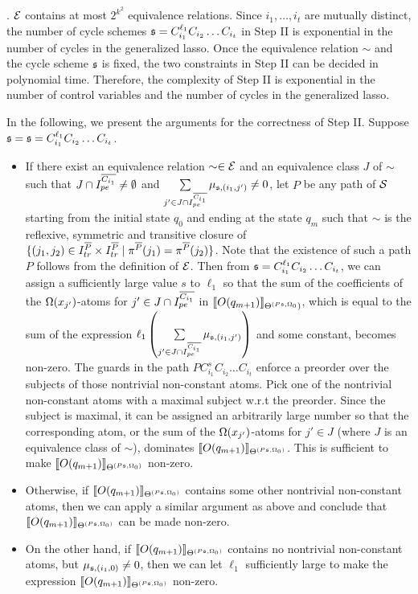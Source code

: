 . ${\mathcal{E} }$ contains at most $2^{k^2}$ equivalence relations. Since $i_1,\dots, i_t$ are mutually distinct, the number of cycle schemes ${\mathfrak{s} } = C_{i_1}^{\ell_1} C_{i_2} \dots C_{i_t}$ in Step II is exponential in the number of cycles in the generalized lasso. Once the equivalence relation $\sim$ and the cycle scheme ${\mathfrak{s} }$ is fixed, the two constraints in Step II can be decided in polynomial time. Therefore, the complexity of Step II is exponential in the number of control variables and the number of cycles in the generalized lasso.

\smallskip
In the following, we present the arguments for the correctness of Step II. Suppose ${\mathfrak{s} } = {\mathfrak{s} }=C_{i_1}^{\ell_1} C_{i_2} \dots C_{i_t}$.
\begin{itemize}
\item If there exist an equivalence relation $\sim \in {\mathcal{E} }$ and an equivalence class $J$ of $\sim$ such that $J \cap I^{\overline{C_{i_1}}}_{pe} \neq \emptyset$ and 
$\sum \limits_{j' \in  J \cap I^{\overline{C_{i_1}}}_{pe}} \mu_{{\mathfrak{s} },(i_1,j')} \neq 0$, let $P$ be any path of ${\mathcal{S} }$ starting from the initial state $q_0$ and ending at the state $q_m$ such that $\sim$ is the reflexive, symmetric and transitive closure of $\{(j_1, j_2) \in I^{\overline{P}}_{tr} \times I^{\overline{P}}_{tr} \mid  \pi^{\overline{P}}(j_1) = \pi^{\overline{P}}(j_2)\}$. Note that the existence of such a path $P$ follows from the definition of ${\mathcal{E} }$. 
Then from ${\mathfrak{s} }=C_{i_1}^{\ell_1} C_{i_2} \dots C_{i_t}$, we can assign a sufficiently large value $s$ to $\ell_1$ so that the sum of the coefficients of the $\Omega(x_{j'})$-atoms for $j' \in  J \cap I^{\overline{C_{i_1}}}_{pe}$ in $\llbracket O(q_{m+1})\rrbracket_{\Theta^{(P{\mathfrak{s} } ,\Omega_0})}$, which is equal to the sum of the expression $\ell_1 \left(\sum \limits_{j' \in  J \cap I^{\overline{C_{i_1}}}_{pe}} \mu_{{\mathfrak{s} },(i_1,j')}\right)$ and some constant,  becomes non-zero.  The guards in the path $P C_{i_1}^{s} C_{i_2} \dots C_{i_t}$ enforce a preorder over the subjects of those nontrivial non-constant atoms.
Pick one of the nontrivial non-constant atoms with a maximal subject w.r.t the preorder. Since the subject is maximal, it can be assigned an arbitrarily large number so that the corresponding atom, or the sum of the $\Omega(x_{j'})$-atoms for $j' \in J$ (where $J$ is an equivalence class of $\sim$), dominates $\llbracket O(q_{m+1})\rrbracket_{\Theta^{(P{\mathfrak{s} },\Omega_0)}}$.  This is sufficient to make $\llbracket O(q_{m+1})\rrbracket_{\Theta^{(P{\mathfrak{s} },\Omega_0)}}$ non-zero.
%
\item Otherwise, if $\llbracket O(q_{m+1})\rrbracket_{\Theta^{(P{\mathfrak{s} },\Omega_0)}}$ contains some other nontrivial non-constant atoms, then we can apply a similar argument as above and conclude that $\llbracket O(q_{m+1})\rrbracket_{\Theta^{(P{\mathfrak{s} },\Omega_0)}}$ can be made non-zero. 

\item On the other hand, if $\llbracket O(q_{m+1})\rrbracket_{\Theta^{(P{\mathfrak{s} },\Omega_0)}}$ contains no nontrivial non-constant atoms, but $\mu_{{\mathfrak{s} },(i_1,0)} \neq 0$, then we can let $\ell_1$ sufficiently large to make the expression $\llbracket O(q_{m+1})\rrbracket_{\Theta^{(P{\mathfrak{s} },\Omega_0)}}$ non-zero. 
\end{itemize} 
